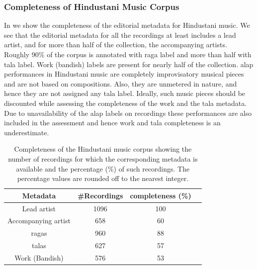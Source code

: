 \subsubsection{Completeness of Hindustani Music Corpus}
\label{sec:corpus_completeness_of_hindustani_music_corpus}

In  we show the completeness of the editorial metadata for Hindustani music. We see that the editorial metadata for all the recordings at least includes a lead artist, and for more than half of the collection, the accompanying artists. Roughly 90\% of the corpus is annotated with \gls{raga} label and more than half with \gls{tala} label. Work (bandish) labels are present for nearly half of the collection. \Gls{alap} performances in Hindustani music are completely improvisatory musical pieces and are not based on compositions. Also, they are unmetered in nature, and hence they are not assigned any \gls{tala} label. Ideally, such music pieces should be discounted while assessing the completeness of the work  and the \gls{tala} metadata. Due to unavailability of the \gls{alap} labels on recordings these performances are also included in the assessment and hence work and \gls{tala} completeness is an underestimate.



\begin{table}
\begin{centering}
	\begin{tabular}{ c c c c}
		\hline
		Metadata	 		&  \#Recordings	& completeness (\%)\\
		\hline
		Lead artist			& 	1096	& 	100	\\						
		Accompanying artist	& 	658		& 	60	\\
		\Glspl{raga}		& 	960		& 	88	\\
		\Glspl{tala}		& 	627		& 	57	\\
		Work (Bandish)		& 	576		& 	53	\\
		
		\hline
		
	\end{tabular}
	\par \end{centering}	
\caption[Completeness of the Hindustani music corpus]{Completeness of the Hindustani music corpus showing the number of recordings for which the corresponding metadata is available and the percentage (\%) of such recordings. The percentage values are rounded off to the nearest integer.} 
\label{tab:completeness_hindustani_corpus}
\end{table}


